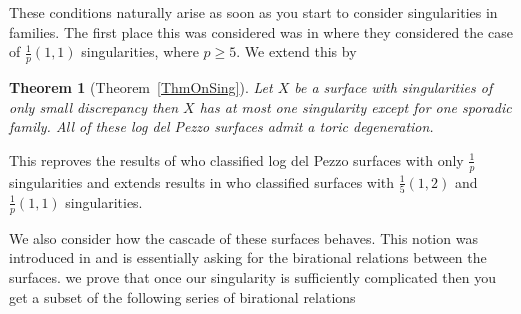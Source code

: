 \documentclass[12pt,a4paper]{book}      %
\newtheorem{thm}{Theorem}[section]
\theoremstyle{definition}
\begin{document}
These conditions naturally arise as soon as you start to consider singularities in families. The first place this was considered was in \cite{CP} where they considered the case of $\frac{1}{p}(1,1)$ singularities, where $p \geq 5$. We extend this by


\begin{thm}[Theorem~\ref{ThmOnSing}]
Let $X$ be a surface with singularities of only small discrepancy then $X$ has at most one singularity except for one sporadic family. All of these log del Pezzo surfaces admit a toric degeneration.
\end{thm}

This reproves the results of \cite{CP} who classified log del Pezzo surfaces with only $\frac{1}{p}$ singularities and extends results in \cite{Cuzzo} who classified surfaces with $\frac{1}{5}(1,2)$  and $\frac{1}{p}(1,1)$ singularities.

We also consider how the cascade of these surfaces behaves. This notion was introduced in \cite{MR2053462} and is essentially asking for the birational relations between the surfaces. we prove that once our singularity is sufficiently complicated then you get a subset of the following series of birational relations
\end{document}
